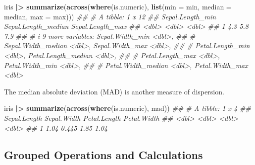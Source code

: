 \documentclass[
  notitlepage]{book}
\newenvironment{Shaded}{\begin{snugshade}}{\end{snugshade}}
\newcommand{\CommentTok}[1]{\textcolor[rgb]{0.56,0.35,0.01}{\textit{#1}}}
\newcommand{\DataTypeTok}[1]{\textcolor[rgb]{0.13,0.29,0.53}{#1}}
\newcommand{\ErrorTok}[1]{\textcolor[rgb]{0.64,0.00,0.00}{\textbf{#1}}}
\newcommand{\KeywordTok}[1]{\textcolor[rgb]{0.13,0.29,0.53}{\textbf{#1}}}
\newcommand{\NormalTok}[1]{#1}
\newcommand{\OperatorTok}[1]{\textcolor[rgb]{0.81,0.36,0.00}{\textbf{#1}}}
\newcommand{\StringTok}[1]{\textcolor[rgb]{0.31,0.60,0.02}{#1}}
\begin{document}
\begin{Shaded}
\begin{Highlighting}[]
\NormalTok{iris }\OperatorTok{|}\ErrorTok{\textgreater{}}\StringTok{ }\KeywordTok{summarize}\NormalTok{(}\KeywordTok{across}\NormalTok{(}\KeywordTok{where}\NormalTok{(is.numeric), }
            \KeywordTok{list}\NormalTok{(}\DataTypeTok{min =}\NormalTok{ min, }
                 \DataTypeTok{median =}\NormalTok{ median, }
                 \DataTypeTok{max =}\NormalTok{ max)))}
\CommentTok{\#\# \# A tibble: 1 x 12}
\CommentTok{\#\#   Sepal.Length\_min Sepal.Length\_median Sepal.Length\_max}
\CommentTok{\#\#              \textless{}dbl\textgreater{}               \textless{}dbl\textgreater{}            \textless{}dbl\textgreater{}}
\CommentTok{\#\# 1              4.3                 5.8              7.9}
\CommentTok{\#\# \# i 9 more variables: Sepal.Width\_min \textless{}dbl\textgreater{},}
\CommentTok{\#\# \#   Sepal.Width\_median \textless{}dbl\textgreater{}, Sepal.Width\_max \textless{}dbl\textgreater{},}
\CommentTok{\#\# \#   Petal.Length\_min \textless{}dbl\textgreater{}, Petal.Length\_median \textless{}dbl\textgreater{},}
\CommentTok{\#\# \#   Petal.Length\_max \textless{}dbl\textgreater{}, Petal.Width\_min \textless{}dbl\textgreater{},}
\CommentTok{\#\# \#   Petal.Width\_median \textless{}dbl\textgreater{}, Petal.Width\_max \textless{}dbl\textgreater{}}
\end{Highlighting}
\end{Shaded}

The median absolute deviation (MAD) is another measure of dispersion.

\begin{Shaded}
\begin{Highlighting}[]
\NormalTok{iris }\OperatorTok{|}\ErrorTok{\textgreater{}}\StringTok{ }\KeywordTok{summarize}\NormalTok{(}\KeywordTok{across}\NormalTok{(}\KeywordTok{where}\NormalTok{(is.numeric), mad))}
\CommentTok{\#\# \# A tibble: 1 x 4}
\CommentTok{\#\#   Sepal.Length Sepal.Width Petal.Length Petal.Width}
\CommentTok{\#\#          \textless{}dbl\textgreater{}       \textless{}dbl\textgreater{}        \textless{}dbl\textgreater{}       \textless{}dbl\textgreater{}}
\CommentTok{\#\# 1         1.04       0.445         1.85        1.04}
\end{Highlighting}
\end{Shaded}

\hypertarget{grouped-operations-and-calculations}{%
\subsection{Grouped Operations and Calculations}\label{grouped-operations-and-calculations}}
\end{document}
